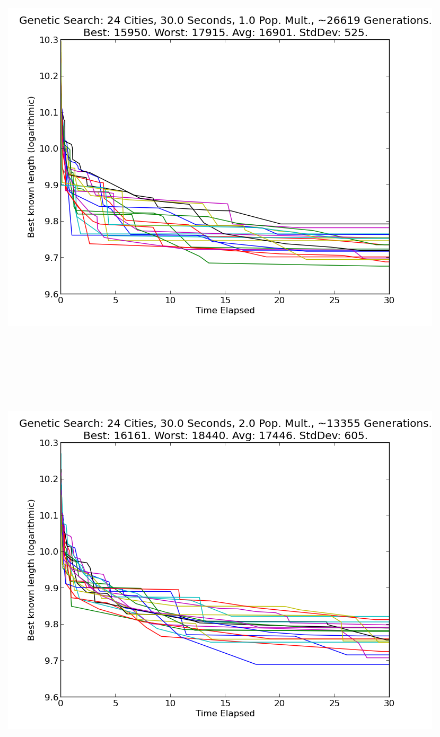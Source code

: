 \documentclass[10pt, conference, compsocconf]{IEEEtran}
\begin{document}
\newpage
$ $
\newpage
\begin{figure}[t]
  \centering
    \includegraphics[width=1\textwidth]{../Example_Output_Images/24_cities/30_seconds/geneticSearch_10_populationMuliplier.png}
\end{figure}
$ $


\newpage
$ $
\newpage
\begin{figure}[t]
  \centering
    \includegraphics[width=1\textwidth]{../Example_Output_Images/24_cities/30_seconds/geneticSearch_20_populationMuliplier.png}
\end{figure}
$ $
\end{document}
